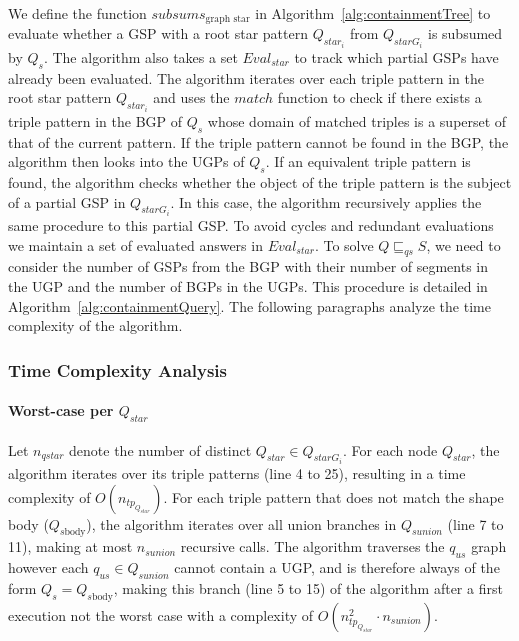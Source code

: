 We define the function $subsums_{\text{graph star}}$ in Algorithm~\ref{alg:containmentTree} to evaluate whether a \ac{GSP} with a root star pattern $Q_{star_i}$ from $Q_{starG_i}$ is subsumed by $Q_s$.
The algorithm also takes a set $Eval_{star}$ to track which partial \acp{GSP} have already been evaluated.
The algorithm iterates over each triple pattern in the root star pattern $Q_{star_i}$ and uses the $match$ function to check if there exists a triple pattern in the \ac{BGP} of $Q_s$ whose domain of matched triples is a superset of that of the current pattern.
If the triple pattern cannot be found in the \ac{BGP}, the algorithm then looks into the \acp{UGP} of $Q_s$.
If an equivalent triple pattern is found, the algorithm checks whether the object of the triple pattern is the subject of a partial \ac{GSP} in $Q_{starG_i}$.
In this case, the algorithm recursively applies the same procedure to this partial \ac{GSP}.
To avoid cycles and redundant evaluations we maintain a set of evaluated answers in $Eval_{star}$.
To solve $Q \sqsubseteq_{qs} S$, we need to consider the number of \acp{GSP} from the \ac{BGP} with their number of segments in the \ac{UGP} and the number of \acp{BGP} in the \acp{UGP}.
This procedure is detailed in Algorithm~\ref{alg:containmentQuery}.
The following paragraphs analyze the time complexity of the algorithm.

\subsubsection{Time Complexity Analysis}

\paragraph{Worst-case per $Q_{star}$}
Let $n_{qstar}$ denote the number of distinct $Q_{star} \in Q_{starG_i}$.
For each node $Q_{star}$, the algorithm iterates over its triple patterns (line 4 to 25), resulting in a time complexity of $O(n_{tp_{Q_{star}}})$.
For each triple pattern that does not match the shape body ($Q_{s\mathrm{body}}$), the algorithm iterates over all union branches in $Q_{sunion}$ (line 7 to 11), making at most $n_{sunion}$ recursive calls.
The algorithm traverses the $q_{us}$ graph however each $q_{us} \in Q_{sunion}$ cannot contain a \ac{UGP}, and is therefore always of the form $Q_s = Q_{s\mathrm{body}}$, making this
branch (line 5 to 15) of the algorithm after a first execution not the worst case with a complexity of $O(n_{tp_{Q_{star}}}^{2} \cdot n_{sunion})$.

